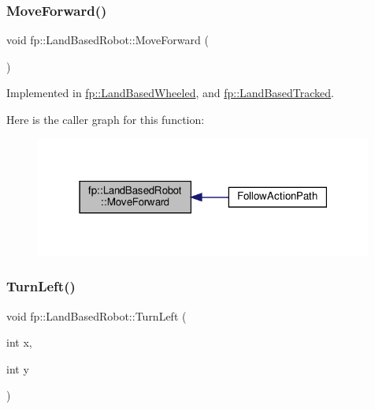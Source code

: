 \subsubsection{\texorpdfstring{Move\+Forward()}{MoveForward()}}
{\footnotesize\ttfamily void fp\+::\+Land\+Based\+Robot\+::\+Move\+Forward (\begin{DoxyParamCaption}{ }\end{DoxyParamCaption})\hspace{0.3cm}{\ttfamily [pure virtual]}}



Implemented in \hyperlink{classfp_1_1_land_based_wheeled_af7875b805655b6f654e49a885f31122a}{fp\+::\+Land\+Based\+Wheeled}, and \hyperlink{classfp_1_1_land_based_tracked_af537a096f507674b62a9691fad7c6cb7}{fp\+::\+Land\+Based\+Tracked}.

Here is the caller graph for this function\+:
\nopagebreak
\begin{figure}[H]
\begin{center}
\leavevmode
\includegraphics[width=315pt]{classfp_1_1_land_based_robot_a5df828c5d6c1f7fb4c7b68f53d9c6080_icgraph}
\end{center}
\end{figure}
\mbox{\label{classfp_1_1_land_based_robot_a359e1012e9093475b7a1b0d38e41a118}} 
\subsubsection{\texorpdfstring{Turn\+Left()}{TurnLeft()}}
{\footnotesize\ttfamily void fp\+::\+Land\+Based\+Robot\+::\+Turn\+Left (\begin{DoxyParamCaption}\item[{int}]{x,  }\item[{int}]{y }\end{DoxyParamCaption})\hspace{0.3cm}{\ttfamily [pure virtual]}}



